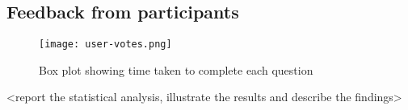 \subsection*{Feedback from participants}
\begin{figure}[H]
    \centering
    \texttt{[image: user-votes.png]}
    \caption{Box plot showing time taken to complete each question}
\end{figure}
\begin{flushleft}
    
\end{flushleft}
<report the statistical analysis, illustrate the results and describe the findings>


